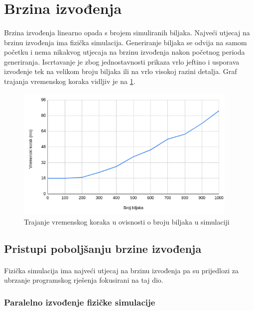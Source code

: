 \documentclass[times, utf8, diplomski]{fer}
\begin{document}
\section{Brzina izvođenja}
\paragraph{}
Brzina izvođenja linearno opada s brojem simuliranih biljaka. Najveći utjecaj na 
brzinu izvođenja ima fizička simulacija. Generiranje biljaka se odvija na samom 
početku i nema nikakvog utjecaja na brzinu izvođenja nakon početnog perioda 
generiranja. Iscrtavanje je zbog jednostavnosti prikaza vrlo jeftino i usporava
izvođenje tek na velikom broju biljaka ili na vrlo visokoj razini detalja. Graf trajanja 
vremenskog koraka vidljiv je na \ref{fig:53-1}.

\begin{figure}[h]
	\centering
	\includegraphics[width=0.95\textwidth]{img/53-1}
	\caption{Trajanje vremenskog koraka u ovisnosti o broju biljaka u simulaciji}
	\label{fig:53-1}
\end{figure}

\subsection{Pristupi poboljšanju brzine izvođenja}
\paragraph{}
Fizička simulacija ima najveći utjecaj na brzinu izvođenja pa su prijedlozi za 
ubrzanje programskog rješenja fokusirani na taj dio.
\subsubsection{Paralelno izvođenje fizičke simulacije}
\end{document}
